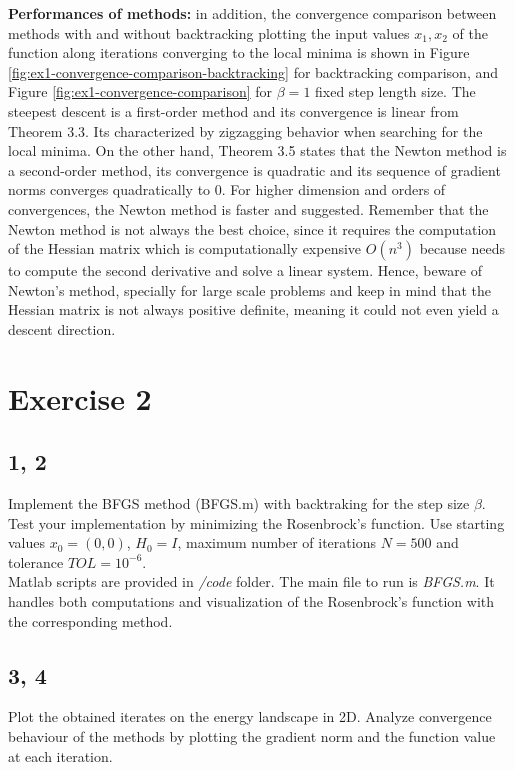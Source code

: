 \documentclass[unicode,11pt,a4paper,oneside,numbers=endperiod,openany]{scrartcl}
\begin{document}
\textbf{Performances of methods:}
in addition, the convergence comparison between methods with and without backtracking
plotting the input values $x_1, x_2$ of the function along iterations converging to the local minima 
is shown in Figure \ref{fig:ex1-convergence-comparison-backtracking} for backtracking comparison, 
and Figure \ref{fig:ex1-convergence-comparison} for $\beta = 1$ fixed step length size.
The steepest descent is a first-order method and its convergence is linear from Theorem 3.3.
Its characterized by zigzagging behavior when searching for the local minima.
On the other hand, Theorem 3.5 states that the Newton method is a second-order method, 
its convergence is quadratic and its sequence of gradient norms converges quadratically to 0.
For higher dimension and orders of convergences, the Newton method is faster and suggested.
Remember that the Newton method is not always the best choice, 
since it requires the computation of the Hessian matrix which is computationally expensive $O(n^3)$ 
because needs to compute the second derivative and solve a linear system. 
Hence, beware of Newton's method, specially for large scale problems 
and keep in mind that the Hessian matrix is not always positive definite, 
meaning it could not even yield a descent direction. 
\clearpage

\section*{Exercise 2}

\subsection*{1, 2}
Implement the BFGS method (BFGS.m) with backtraking for the step size $\beta$. 
Test your implementation by minimizing the Rosenbrock's function. 
Use starting values $x_0 = (0, 0)$, 
$H_0 = I$, 
maximum number of iterations $N = 500$ and tolerance $TOL = 10^{-6}$.
\\\newline
Matlab scripts are provided in \textit{/code} folder.
The main file to run is \textit{BFGS.m}.
It handles both computations and visualization of the Rosenbrock's function with the corresponding method.

\subsection*{3, 4}
Plot the obtained iterates on the energy landscape in 2D.
Analyze convergence behaviour of the methods by plotting the gradient norm and the function
value at each iteration.
\end{document}
